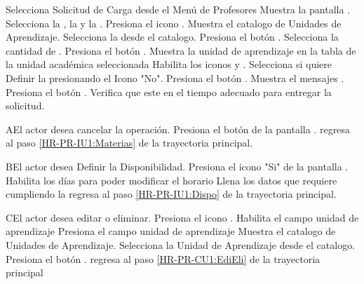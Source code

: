 \begin{UCtrayectoria}
	\UCpaso [\UCactor] Selecciona Solicitud de Carga desde el Menú de Profesores
	\UCpaso [\UCsist] Muestra la pantalla . 
	\UCpaso [\UCactor] Selecciona la , la  y la .
	\UCpaso [\UCactor] Presiona el icono \IUBuscar. \label{HR-PR-IU1:Materias}
	\UCpaso [\UCsist] Muestra el catalogo de Unidades de Aprendizaje. 
	\UCpaso [\UCactor] Selecciona la  desde el catalogo.
	\UCpaso [\UCactor] Presiona el botón . 
	\UCpaso [\UCactor] Selecciona la cantidad de .
	\UCpaso [\UCactor] Presiona el botón .
	\UCpaso [\UCsist] Muestra la unidad de aprendizaje en la tabla de la unidad académica seleccionada
	\UCpaso [\UCsist] Habilita los iconos \IURegistrar y \IUEliminar.
	\UCpaso [\UCactor] Selecciona si quiere Definir la  presionando el Icono "No".   \label{HR-PR-CU1:EdiEli}
	\UCpaso [\UCactor] Presiona el botón .   \label{HR-PR-IU1:Dispo}
	\UCpaso [\UCsist] Muestra el mensajes .
	\UCpaso [\UCactor] Presiona el botón . 
	\UCpaso [\UCsist] Verifica que este en el tiempo adecuado para entregar la solicitud. 
\end{UCtrayectoria}

\begin{UCtrayectoriaA}{A}{El actor desea cancelar la operación.}
	\UCpaso [\UCactor] Presiona el botón  de la pantalla .
	\UCpaso regresa al paso \ref{HR-PR-IU1:Materias} de la trayectoria principal.
\end{UCtrayectoriaA} 

\begin{UCtrayectoriaA}{B}{El actor desea Definir la Disponibilidad.}
	\UCpaso [\UCactor] Presiona el icono "Si" de la pantalla .
	\UCpaso [\UCsist] Habilita los días para poder modificar el horario
	\UCpaso [\UCactor] Llena los datos que requiere cumpliendo la  
	\UCpaso regresa al paso \ref{HR-PR-IU1:Dispo} de la trayectoria principal.
\end{UCtrayectoriaA} 

\begin{UCtrayectoriaA}{C}{El actor desea editar o eliminar.}
	\UCpaso [\UCactor] Presiona el icono \IURegistrar. 
	\UCpaso [\UCsist] Habilita el campo unidad de aprendizaje
	\UCpaso [\UCactor] Presiona el campo unidad de aprendizaje 
	\UCpaso [\UCsist] Muestra el catalogo de Unidades de Aprendizaje. 
	\UCpaso [\UCactor] Selecciona la Unidad de Aprendizaje desde el catalogo.
	\UCpaso [\UCactor] Presiona el botón . 
	\UCpaso [\UCsist] regresa al paso \ref{HR-PR-CU1:EdiEli} de la trayectoria principal
\end{UCtrayectoriaA} 

